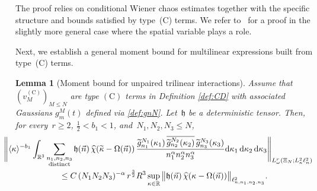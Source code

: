 \documentclass[11pt,reqno,english]{amsart}
\numberwithin{equation}{section}
\theoremstyle{plain}
\newtheorem{lemma}[theorem]{Lemma}
\theoremstyle{definition}
\theoremstyle{remark}
\newcommand{\R}{\mathbb{R}}
\begin{document}
The proof relies on conditional Wiener chaos estimates together with the specific structure and bounds satisfied by type~(C) terms. We refer to~\cite[Lemma~8.2]{BCST24} for a proof in the slightly more general case where the spatial variable plays a role.

Next, we establish a general moment bound for multilinear expressions built from type~(C) terms.


\begin{lemma}[Moment bound for unpaired trilinear interactions]
	\label{momentbd'}
Assume that $(v^{(\mathrm{C})}_{M})_{M\leq N}$ are type $(\mathrm{C})$ terms in Definition \ref{def:CD} with associated Gaussians $g_{m}^M(t)$ defined via \eqref{def:gnN}.
Let~$\mathfrak{h}$ be a deterministic tensor.
	Then, for every~$r\geq2$, $\frac12<b_1<1$, and~$N_1,N_2,N_3\leq N$,
	\begin{multline}
		\label{eq:momentbd}
		\hspace{-15pt}\Bigg\|
		\langle\kappa\rangle^{-b_{1}}
		\int_{\R^{3}}
		\sum_{\substack{n_{1},n_{2},n_{3}\\ \mathrm{distinct}}}
		\mathfrak{h}(\vec n)\,
		\widehat{\chi}(\widetilde{\kappa}-\Omega(\vec{n}))\,
		\frac{
			\widetilde{g}_{n_{1}}^{N_{1}}(\kappa_{1})\,
			\overline{\widetilde{g}_{n_{2}}^{N_{2}}(\kappa_{2})}\,
			\widetilde{g}_{n_{3}}^{N_{3}}(\kappa_{3})
		}{
			n_{1}^{\alpha}
			n_{2}^{\alpha}
			n_{3}^{\alpha}}
		\mathrm{d}\kappa_1\,\mathrm{d}\kappa_2\,\mathrm{d}\kappa_3
		\Bigg\|_{L_{\omega}^{r}(\Xi_{N};L_{\kappa}^2\ell_{n}^{2})}
		\\
		\leq
		C\,(N_1N_2N_3)^{-\alpha}\,r^{\frac{3}{2}}R^3
		\sup_{\kappa\in\R}
		\big\|
		\mathfrak{h}(\vec n)\,
		\widehat{\chi}(\kappa-\Omega(\vec{n}))
		\big\|_{\ell_{n,n_{1},n_{2},n_{3}}^{2}}.
	\end{multline}
\end{lemma}
\end{document}
